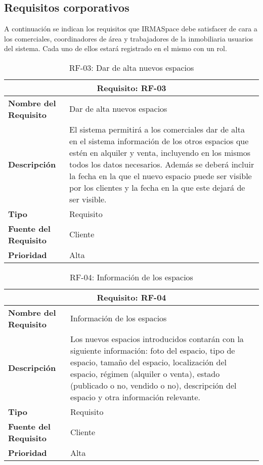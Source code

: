 \subsection{Requisitos corporativos}

\par A continuación se indican los requisitos que IRMASpace debe satisfacer de cara a los comerciales, coordinadores de área y trabajadores de la inmobiliaria usuarios del sistema. Cada uno de ellos estará registrado en el mismo con un rol.

\begin{table}[H]
\begin{center}
\begin{tabular}{p{} p{7cm}}
\multicolumn{2}{c}{\textbf{Requisito: RF-03} } \\
\hline \hline
\textbf{Nombre del Requisito} & Dar de alta nuevos espacios  \\
\hline
\textbf{Descripción} & El sistema permitirá a los comerciales dar de alta en el sistema información de los otros espacios que estén en alquiler y venta, incluyendo en los mismos todos los datos necesarios. Además se deberá incluir la fecha en la que el nuevo espacio puede ser visible por los clientes y la fecha en la que este dejará de ser visible.\\
\hline
\textbf{Tipo} & Requisito  \\
\hline
\textbf{Fuente del Requisito} & Cliente \\
\hline
\textbf{Prioridad} &  Alta \\ \hline
\end{tabular}
\caption{RF-03: Dar de alta nuevos espacios}
\label{tab:RF-03}
\end{center}
\end{table}

\begin{table}[H]
\begin{center}
\begin{tabular}{p{} p{7cm}}
\multicolumn{2}{c}{\textbf{Requisito: RF-04} } \\
\hline \hline
\textbf{Nombre del Requisito} & Información de los espacios \\
\hline
\textbf{Descripción} & Los nuevos espacios introducidos contarán con la siguiente información: foto del espacio, tipo de espacio, tamaño del espacio, localización del espacio, régimen (alquiler o venta), estado (publicado o no, vendido o no), descripción del espacio y otra información relevante.\\
\hline
\textbf{Tipo} & Requisito  \\
\hline
\textbf{Fuente del Requisito} & Cliente \\
\hline
\textbf{Prioridad} &  Alta \\ \hline
\end{tabular}
\caption{RF-04: Información de los espacios}
\label{tab:RF-04}
\end{center}
\end{table}

